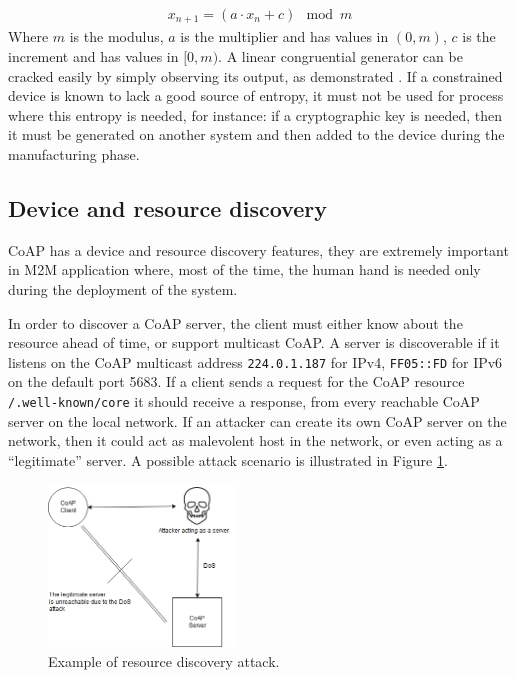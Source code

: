 	\begin{align*}
	x_{n+1}=(a\cdot x_n+c)\mod m
	\end{align*}
	Where $m$ is the modulus, $a$ is the multiplier and has values in $(0,m)$, $c$ is the increment and has values in $[0,m)$.
	A linear congruential generator can be cracked easily by simply observing its output, as demonstrated \cite{rng}. \newline
	If a constrained device is known to lack a good source of entropy, it must not be used for process where this entropy is needed, for instance: if a cryptographic key is needed, then it must be generated on another system and then added to the device during the manufacturing phase.
	
	\subsection{Device and resource discovery}
	CoAP has a device and resource discovery features, they are extremely important in M2M application where, most of the time, the human hand is needed only during the deployment of the system.\newline
	
	In order to discover a CoAP server, the client must either know about the resource ahead of time, or support multicast CoAP.\newline
	A server is discoverable if it listens on the CoAP multicast address \texttt{224.0.1.187} for IPv4, \texttt{FF05::FD} for IPv6 on the default port 5683.\newline
	If a client sends a request for the CoAP resource \texttt{/.well-known/core} it should receive a response, from every reachable CoAP server on the local network.
	If an attacker can create its own CoAP server on the network, then it could act as malevolent host in the network, or even acting as a ``legitimate'' server.
	A possible attack scenario is illustrated in Figure \ref{fig:coap-vuln5}.
	
	\begin{figure}
		\centering
		\includegraphics[width=5cm]{coap-vuln-img5.png}
		\caption{Example of resource discovery attack.}
		\label{fig:coap-vuln5}
	\end{figure}
	
